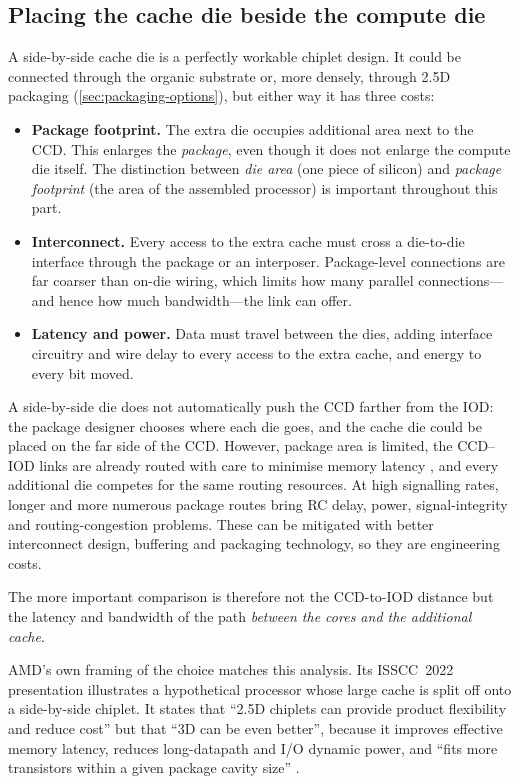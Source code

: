 \subsection{Placing the cache die beside the compute die}
A side-by-side cache die is a perfectly workable chiplet design. It could be connected through the organic substrate or, more densely, through 2.5D packaging (\cref{sec:packaging-options}), but either way it has three costs:
\begin{itemize}
  \item \textbf{Package footprint.} The extra die occupies additional area next to the CCD. This enlarges the \emph{package}, even though it does not enlarge the compute die itself. The distinction between \emph{die area} (one piece of silicon) and \emph{package footprint} (the area of the assembled processor) is important throughout this part.
  \item \textbf{Interconnect.} Every access to the extra cache must cross a die-to-die interface through the package or an interposer. Package-level connections are far coarser than on-die wiring, which limits how many parallel connections---and hence how much bandwidth---the link can offer.
  \item \textbf{Latency and power.} Data must travel between the dies, adding interface circuitry and wire delay to every access to the extra cache, and energy to every bit moved.
\end{itemize}

A side-by-side die does not automatically push the CCD farther from the IOD: the package designer chooses where each die goes, and the cache die could be placed on the far side of the CCD. However, package area is limited, the CCD--IOD links are already routed with care to minimise memory latency \cite{naffziger2020chiplet}, and every additional die competes for the same routing resources. At high signalling rates, longer and more numerous package routes bring RC delay, power, signal-integrity and routing-congestion problems. These can be mitigated with better interconnect design, buffering and packaging technology, so they are engineering costs.

The more important comparison is therefore not the CCD-to-IOD distance but the latency and bandwidth of the path \emph{between the cores and the additional cache}.

AMD's own framing of the choice matches this analysis. Its ISSCC~2022 presentation illustrates a hypothetical processor whose large cache is split off onto a side-by-side chiplet. It states that ``2.5D chiplets can provide product flexibility and reduce cost'' but that ``3D can be even better'', because it improves effective memory latency, reduces long-datapath and I/O dynamic power, and ``fits more transistors within a given package cavity size'' \cite[slide~7]{wuu2022vcache}.

